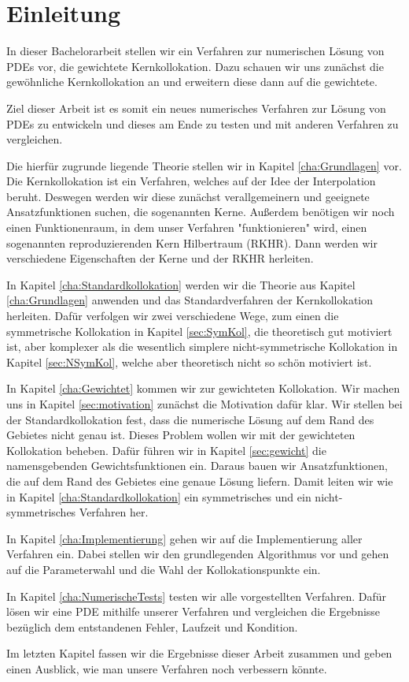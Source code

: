 \chapter{Einleitung}
\label{cha:Einleitung}
In dieser Bachelorarbeit stellen wir ein Verfahren zur numerischen Lösung von \acp{PDE} vor, die gewichtete Kernkollokation. Dazu schauen wir uns zunächst die gewöhnliche Kernkollokation an und erweitern diese dann auf die gewichtete.

Ziel dieser Arbeit ist es somit ein neues numerisches Verfahren zur Lösung von \acp{PDE} zu entwickeln und dieses am Ende zu testen und mit anderen Verfahren zu vergleichen.

Die hierfür zugrunde liegende Theorie stellen wir in Kapitel \ref{cha:Grundlagen} vor. Die Kernkollokation ist ein Verfahren, welches auf der Idee der Interpolation beruht. Deswegen werden wir diese zunächst verallgemeinern und geeignete Ansatzfunktionen suchen, die sogenannten Kerne. Außerdem benötigen wir noch einen Funktionenraum, in dem unser Verfahren "funktionieren" wird, einen sogenannten reproduzierenden Kern Hilbertraum (\acs{RKHR}).  Dann werden wir verschiedene Eigenschaften der Kerne und der \ac{RKHR} herleiten.

In Kapitel \ref{cha:Standardkollokation} werden wir die Theorie aus Kapitel \ref{cha:Grundlagen} anwenden und das Standardverfahren der Kernkollokation herleiten. Dafür verfolgen wir zwei verschiedene Wege, zum einen die symmetrische Kollokation in Kapitel \ref{sec:SymKol}, die theoretisch gut motiviert ist, aber komplexer als die wesentlich simplere nicht-symmetrische Kollokation in Kapitel \ref{sec:NSymKol}, welche aber theoretisch nicht so schön motiviert ist.

In Kapitel \ref{cha:Gewichtet} kommen wir zur gewichteten Kollokation. Wir machen uns in Kapitel \ref{sec:motivation} zunächst die Motivation dafür klar. Wir stellen bei der Standardkollokation fest, dass die numerische Lösung auf dem Rand des Gebietes nicht genau ist. Dieses Problem wollen wir mit der gewichteten Kollokation beheben. Dafür führen wir in Kapitel \ref{sec:gewicht} die namensgebenden Gewichtsfunktionen ein. Daraus bauen wir Ansatzfunktionen, die auf dem Rand des Gebietes eine genaue Lösung liefern. Damit leiten wir wie in Kapitel \ref{cha:Standardkollokation} ein symmetrisches und ein nicht-symmetrisches Verfahren her.

In Kapitel \ref{cha:Implementierung} gehen wir auf die Implementierung aller Verfahren ein. Dabei stellen wir den grundlegenden Algorithmus vor und gehen auf die Parameterwahl und die Wahl der Kollokationspunkte ein.

In Kapitel \ref{cha:NumerischeTests} testen wir alle vorgestellten Verfahren. Dafür lösen wir eine \ac{PDE} mithilfe unserer Verfahren und vergleichen die Ergebnisse bezüglich dem entstandenen Fehler, Laufzeit und Kondition.

Im letzten Kapitel fassen wir die Ergebnisse dieser Arbeit zusammen und geben einen Ausblick, wie man unsere Verfahren noch verbessern könnte.

\glsresetall